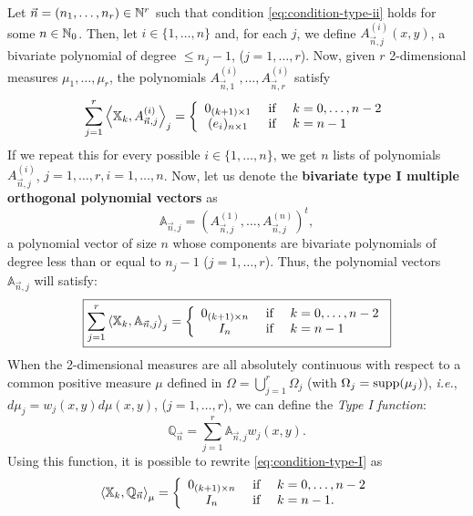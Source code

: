 \documentclass[portrait,final,a0paper,fontscale=0.38]{baposter}
\begin{document}
\begin{poster}
{
\begin{multicols}{2}
  Let $\vec n = (n_1,\dots,n_r)\in\mathbb{N}^r$ such that condition \eqref{eq:condition-type-ii} holds for some $n\in\mathbb{N}_0$. Then, let $i\in\{1,\dots,n\}$ and, for each $j$, we define $A_{\vec n, j}^{(i)}(x,y)$, a bivariate polynomial of degree $\leq n_j-1$, ($j=1,\dots,r$). Now, given $r$ 2-dimensional measures $\mu_1,\dots,\mu_r$, the polynomials $A_{\vec n, 1}^{(i)}, \dots, A_{\vec n, r}^{(i)}$ satisfy
\begin{equation}
    \label{eq:first-condition-type-I}
    \sum_{j=1}^r \left\langle \mathbb X_k , A_{\vec n,j}^{(i)} \right\rangle_j = \left\{\begin{array}{ccl}
        0_{(k+1)\times 1} &   \text{ if } & k=0,\dots,n-2 \\
        (e_i)_{n\times 1}  & \text{ if } & k=n-1      
    \end{array}\right.
\end{equation}
If we repeat this for every possible $i\in\{1,\dots,n\}$, we get $n$ lists of polynomials $A_{\vec n, j}^{(i)}$, $j=1,\dots,r, i=1,\dots,n$. Now, let us denote the \textbf{bivariate type I multiple orthogonal polynomial vectors} as
$$
\mathbb A_{\vec n,j} = (A_{\vec n, j}^{(1)}, \dots, A_{\vec n, j}^{(n)})^t,
$$
a polynomial vector of size $n$ whose components are bivariate polynomials of degree less than or equal to $n_j-1$ ($j=1,\dots,r$). Thus, the polynomial vectors $\mathbb A_{\vec n,j}$ will satisfy:
\begin{equation}
    \label{eq:condition-type-I}
    \boxed{\sum_{j=1}^r \left\langle \mathbb X_k , \mathbb A_{\vec n,j} \right\rangle_j = \left\{\begin{array}{ccl}
        0_{(k+1)\times n} &   \text{ if } & k=0,\dots,n-2 \\
        I_n & \text{ if } & k=n-1      
    \end{array}\right.}
\end{equation}
When the 2-dimensional measures are all absolutely continuous with respect to a common positive measure $\mu$ defined in \linebreak$\Omega = \displaystyle\bigcup_{j=1}^r \Omega_j$ (with $\Omega_j=\mathrm{supp}(\mu_j)$), \textit{i.e.}, $d\mu_j = w_j(x,y)d\mu(x,y)$, ($j=1,\dots,r$), we can define the \textit{Type I function}:
\begin{equation}
    \label{eq:type-I-function-2-vars}
    \mathbb Q_{\vec n} = \sum_{j=1}^r \mathbb A_{\vec n,j}w_j(x,y).
\end{equation}
Using this function, it is possible to rewrite \eqref{eq:condition-type-I} as
\begin{equation}
    \left\langle \mathbb X_k , \mathbb Q_{\vec n} \right\rangle_\mu = \left\{\begin{array}{ccl}
        0_{(k+1)\times n} &   \text{ if } & k=0,\dots,n-2 \\
        I_n & \text{ if } & k=n-1.
    \end{array}\right.     
\end{equation}


\end{multicols}}
\end{poster}
\end{document}
